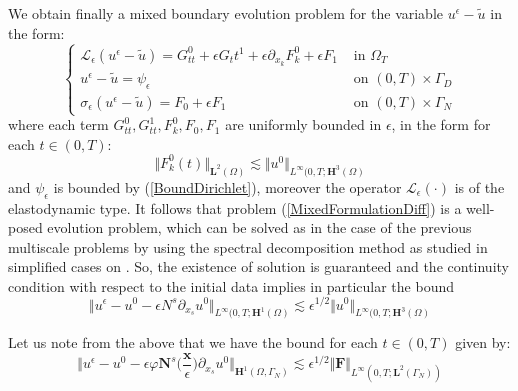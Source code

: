 We obtain finally a mixed boundary evolution problem for the variable $u^{\epsilon} - \tilde{u}$ in the form:
\begin{equation}
    \label{MixedFormulationDiff}
    \left \{
    \begin{aligned}
        \mathcal{L}_{\epsilon}(u^{\epsilon} - \tilde{u}) = G_{tt}^0 + \epsilon G_tt^1 + \epsilon \partial_{x_k} F_k^0 + \epsilon F_1   & \text{ in } \Omega_T \\
        u^{\epsilon}-\tilde{u} = \psi_{\epsilon} & \text{ on } (0,T)\times \Gamma_D\\
        \sigma_{\epsilon}(u^{\epsilon}-\tilde{u}) = F_0 + \epsilon F_1 & \text{ on } (0,T)\times\Gamma_N
    \end{aligned}
    \right .
\end{equation}
where each term $G_{tt}^0, G_{tt}^1, F_k^0, F_0, F_1$ are uniformly bounded in $\epsilon$, in the form for each $t \in (0,T)$:
\begin{equation*}
    \Vert F_k^0(t) \Vert_{\mathbf{L}^2(\Omega)} \lesssim \Vert u^0 \Vert_{L^{\infty}(0,T; \mathbf{H}^3(\Omega)}
\end{equation*}
and $\psi_{\epsilon}$ is bounded by (\ref{BoundDirichlet}), moreover the operator $\mathcal{L}_{\epsilon}(\cdot)$ is of the elastodynamic type.
It follows that problem (\ref{MixedFormulationDiff}) is a well-posed evolution problem, which can be solved as in the case of the previous multiscale problems by using the spectral decomposition method as studied in simplified cases on \cite{raviart1983introduction}. So, the existence of solution is guaranteed and the continuity condition with respect to the initial data implies in particular the bound
\begin{equation*}
    \Vert u^{\epsilon} - u^0 - \epsilon N^s \partial_{x_s}u^0 \Vert_{L^{\infty}(0,T; \mathbf{H}^1(\Omega)} \lesssim \epsilon^{1/2} \Vert u^0 \Vert_{L^{\infty}(0,T; \mathbf{H}^3(\Omega)}
\end{equation*}


\begin{rem}
Let us note from the above that we have the bound for each $t \in (0,T)$ given by:
\begin{equation}
    \label{TimeBound}
    \Vert u^{\epsilon} - u^0 - \epsilon \varphi \mathbf{N}^s\big( \frac{\mathbf{x}}{\epsilon} \big) \partial_{x_s} u^0 \Vert_{\mathbf{H}^1(\Omega, \Gamma_N)} \lesssim \epsilon^{1/2} \Vert \mathbf{F}\Vert_{L^{\infty}(0,T;\mathbf{L}^{2}(\Gamma_N))}
\end{equation}
\end{rem}
